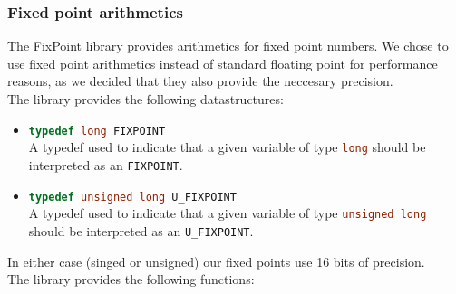 \documentclass{report}
\begin{document}
\subsubsection{Fixed point arithmetics}
The FixPoint library provides arithmetics for fixed point numbers. We chose to use fixed point arithmetics instead of standard floating point for performance reasons, as we decided that they also provide the neccesary precision. \\
The library provides the following datastructures:
\begin{itemize}
	\item \lstinline[language=c++]{typedef long FIXPOINT} \\
		A typedef used to indicate that a given variable of type \lstinline[language=c++]{long} should be interpreted as an \lstinline{FIXPOINT}.
	\item \lstinline[language=c++]{typedef unsigned long U_FIXPOINT} \\
		A typedef used to indicate that a given variable of type \lstinline[language=c++]{unsigned long} should be interpreted as an \lstinline{U_FIXPOINT}.
\end{itemize}
In either case (singed or unsigned) our fixed points use 16 bits of precision. \\
The library provides the following functions:
\end{document}
